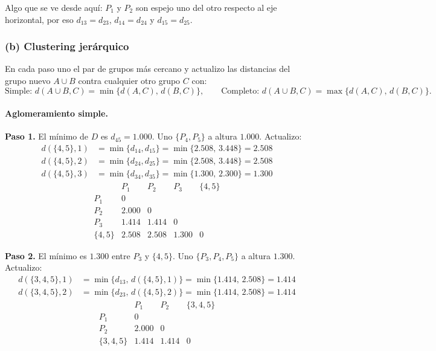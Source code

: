 \documentclass[11pt]{article}\usepackage[]{graphicx}\usepackage[]{xcolor}
\begin{document}
Algo que se ve desde aquí: $P_1$ y $P_2$ son espejo uno del otro respecto al eje horizontal, por eso $d_{13}=d_{23}$, $d_{14}=d_{24}$ y $d_{15}=d_{25}$.

\subsubsection*{(b) Clustering jerárquico}

En cada paso uno el par de grupos más cercano y actualizo las distancias del grupo nuevo $A\cup B$ contra cualquier otro grupo $C$ con:
\[
\text{Simple: } d(A\cup B, C) = \min\{d(A,C),\, d(B,C)\},
\qquad
\text{Completo: } d(A\cup B, C) = \max\{d(A,C),\, d(B,C)\}.
\]

\paragraph{Aglomeramiento simple.}

\textbf{Paso 1.} El mínimo de $D$ es $d_{45} = 1.000$. Uno $\{P_4,P_5\}$ a altura $1.000$. Actualizo:
\begin{align*}
d(\{4,5\}, 1) &= \min\{d_{14}, d_{15}\} = \min\{2.508,\, 3.448\} = 2.508\\
d(\{4,5\}, 2) &= \min\{d_{24}, d_{25}\} = \min\{2.508,\, 3.448\} = 2.508\\
d(\{4,5\}, 3) &= \min\{d_{34}, d_{35}\} = \min\{1.300,\, 2.300\} = 1.300
\end{align*}
\[
\begin{array}{c|cccc}
 & P_1 & P_2 & P_3 & \{4,5\}\\ \hline
P_1 & 0 & & & \\
P_2 & 2.000 & 0 & & \\
P_3 & 1.414 & 1.414 & 0 & \\
\{4,5\} & 2.508 & 2.508 & \mathbf{1.300} & 0
\end{array}
\]

\textbf{Paso 2.} El mínimo es $1.300$ entre $P_3$ y $\{4,5\}$. Uno $\{P_3,P_4,P_5\}$ a altura $1.300$. Actualizo:
\begin{align*}
d(\{3,4,5\}, 1) &= \min\{d_{13},\, d(\{4,5\},1)\} = \min\{1.414,\, 2.508\} = 1.414\\
d(\{3,4,5\}, 2) &= \min\{d_{23},\, d(\{4,5\},2)\} = \min\{1.414,\, 2.508\} = 1.414
\end{align*}
\[
\begin{array}{c|ccc}
 & P_1 & P_2 & \{3,4,5\}\\ \hline
P_1 & 0 & & \\
P_2 & 2.000 & 0 & \\
\{3,4,5\} & \mathbf{1.414} & \mathbf{1.414} & 0
\end{array}
\]
\end{document}

